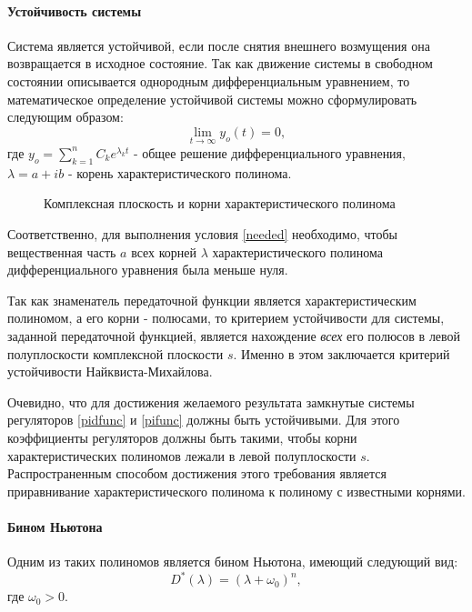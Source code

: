 \paragraph*{Устойчивость системы\\}

\hspace*{\parindent}Система является устойчивой, если после снятия внешнего возмущения она возвращается в исходное состояние. Так как движение системы в свободном состоянии описывается однородным дифференциальным уравнением, то математическое определение устойчивой системы можно сформулировать следующим образом: 
\begin{equation}\label{needed}
	\lim_{t \to \infty} y_{o}(t) = 0,
\end{equation}
где $y_{o} = \sum_{k=1}^{n} C_ke^{\lambda_kt}$ - общее решение дифференциального уравнения, $\lambda = a+ib$ - корень характеристического полинома.

\begin{figure}[h]
	\noindent{}
	\caption{Комплексная плоскость и корни характеристического полинома}
\end{figure}

Соответственно, для выполнения условия \eqref{needed} необходимо, чтобы вещественная часть $a$ всех корней $\lambda$ характеристического полинома дифференциального уравнения была меньше нуля. 

Так как знаменатель передаточной функции является характеристическим полиномом, а его корни - полюсами, то критерием устойчивости для системы, заданной передаточной функцией, является нахождение \textit{всех} его полюсов в левой полуплоскости  комплексной плоскости $s$. Именно в этом заключается критерий устойчивости Найквиста-Михайлова.

Очевидно, что для достижения желаемого результата замкнутые системы регуляторов \eqref{pidfunc} и \eqref{pifunc} должны быть устойчивыми. Для этого коэффициенты регуляторов должны быть такими, чтобы корни характеристических полиномов лежали в левой полуплоскости $s$. Распространенным способом достижения этого требования является приравнивание характеристического полинома к полиному с известными корнями.

\paragraph*{Бином Ньютона\\}
\hspace*{\parindent}Одним из таких полиномов является бином Ньютона, имеющий следующий вид: 
\begin{equation}\label{newt}
	D^*(\lambda)=(\lambda+\omega_0)^n,
\end{equation}
где $\omega_0 > 0$.

